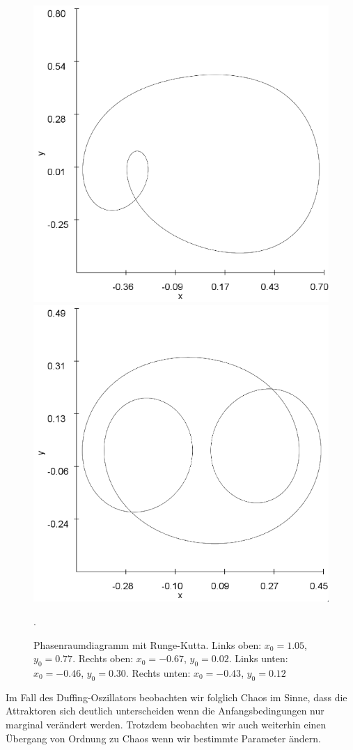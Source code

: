 \documentclass[12pt,a4paper]{article}
\begin{document}
\begin{figure}[!htbp]
\includegraphics[scale=0.4]{duffing-awp4-500k-nach-500k-h0,01-runge}
\includegraphics[scale=0.4]{duffing-awp5-500k-nach-500k-h0,01-runge}
\caption{Phasenraumdiagramm mit Runge-Kutta. Links oben: $x_0=1.05$, $y_0=0.77$. Rechts oben: $x_0=-0.67$, $y_0=0.02$. Links unten: $x_0=-0.46$, $y_0=0.30$. Rechts unten: $x_0=-0.43$, $y_0=0.12$}. 
\label{fig:duffing-allawp}
\end{figure}
Im Fall des Duffing-Oszillators beobachten wir folglich Chaos im Sinne, dass die Attraktoren sich deutlich unterscheiden wenn die Anfangsbedingungen nur marginal verändert werden. Trotzdem beobachten wir auch weiterhin einen Übergang von Ordnung zu Chaos wenn wir bestimmte Parameter ändern. 
\end{document}
